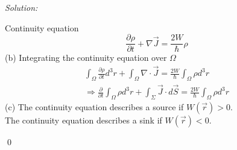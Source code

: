 \documentclass[12pt]{article}
\newenvironment{sol}
    {\emph{Solution:}
    }
    {
    \qed
    }
\begin{document}
\begin{sol}
\begin{equation}
\end{equation}
Continuity equation
\begin{equation}
\frac{\partial\rho}{\partial t}+\nabla\vec{J}=\frac{2W}{\hbar}\rho
\end{equation}
(b) Integrating the continuity equation over $\Omega$
\begin{gather}
\int_{\Omega}\frac{\partial\rho}{\partial t}d^3r+\int_{\Omega}\nabla\cdot\vec{J}=\frac{2W}{\hbar}\int_{\Omega}\rho d^3r\\
\Longrightarrow\frac{\partial}{\partial t}\int_{\Omega}\rho d^3r+\int_{\Sigma}\vec{J}\cdot d\vec{S}=\frac{2W}{\hbar}\int_{\Omega}\rho d^3r
\end{gather}
(c) The continuity equation describes a source if $W(\vec{r})>0$.\\
The continuity equation describes a sink if $W(\vec{r})<0$.
\end{sol}
\end{document}
